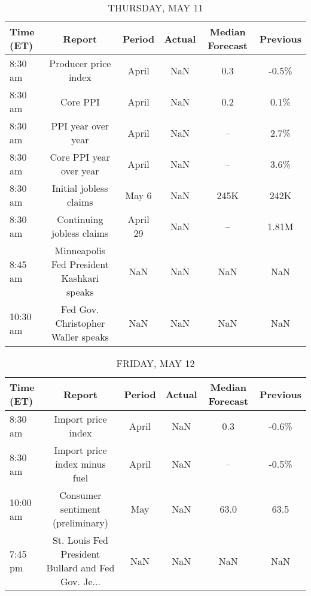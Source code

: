 \documentclass{article}%
\begin{document}
%


\begin{table}[htbp]%
\caption{THURSDAY, MAY 11}%
\centering%
\begin{adjustbox}{width=1\textwidth}%
\begin{tabular}{lccccc}
\toprule
Time (ET) &                                    Report &   Period & Actual & Median Forecast & Previous \\
\midrule
  8:30 am &                      Producer price index &    April &    NaN &             0.3 &    -0.5\% \\
  8:30 am &                                  Core PPI &    April &    NaN &             0.2 &     0.1\% \\
  8:30 am &                        PPI year over year &    April &    NaN &              -- &     2.7\% \\
  8:30 am &                   Core PPI year over year &    April &    NaN &              -- &     3.6\% \\
  8:30 am &                    Initial jobless claims &    May 6 &    NaN &            245K &     242K \\
  8:30 am &                 Continuing jobless claims & April 29 &    NaN &              -- &    1.81M \\
  8:45 am & Minneapolis Fed President Kashkari speaks &      NaN &    NaN &             NaN &      NaN \\
 10:30 am &        Fed Gov. Christopher Waller speaks &      NaN &    NaN &             NaN &      NaN \\
\bottomrule
\end{tabular}
%
\end{adjustbox}%
\end{table}

%


\begin{table}[htbp]%
\caption{FRIDAY, MAY 12}%
\centering%
\begin{adjustbox}{width=1\textwidth}%
\begin{tabular}{lccccc}
\toprule
Time (ET) &                                             Report & Period & Actual & Median Forecast & Previous \\
\midrule
  8:30 am &                                 Import price index &  April &    NaN &             0.3 &    -0.6\% \\
  8:30 am &                      Import price index minus fuel &  April &    NaN &              -- &    -0.5\% \\
 10:00 am &                   Consumer sentiment (preliminary) &    May &    NaN &            63.0 &     63.5 \\
  7:45 pm & St. Louis Fed President Bullard and Fed Gov. Je... &    NaN &    NaN &             NaN &      NaN \\
\bottomrule
\end{tabular}
%
\end{adjustbox}%
\end{table}
\end{document}
